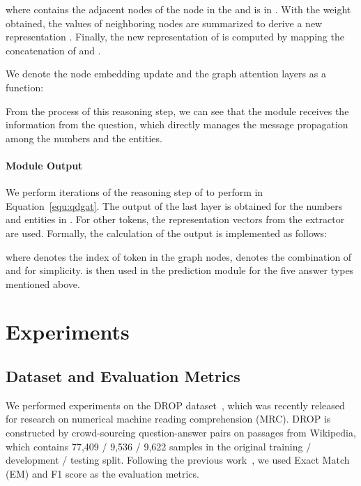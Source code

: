 \documentclass{article}
\begin{document}
where  contains the adjacent nodes of the node  in the  and  is in  .
With the weight  obtained, the values of neighboring nodes are summarized to derive a new representation .
Finally, the new representation of  is computed by mapping the concatenation of  and .


We denote the node embedding update and the graph attention layers as a function:

From the process of this reasoning step, we can see that the module receives the information from the question, which directly manages the message propagation among the numbers and the entities. 

\paragraph{Module Output}
We perform  iterations of the reasoning step of  to perform  in Equation~\ref{equ:qdgat}.
The output of the last layer  is obtained for the numbers and entities in .
For other tokens, the representation vectors from the extractor are used.
Formally, the calculation of the output  is implemented as follows:

where  denotes the index of token  in the graph nodes,  denotes the combination of  and  for simplicity.
 is then used in the prediction module for the five answer types mentioned above. 

\section{Experiments}

\subsection{Dataset and Evaluation Metrics}

We performed experiments on the DROP dataset~\cite{DBLP:conf/naacl/DuaWDSS019}, which was recently released for research on numerical machine reading comprehension (MRC). DROP is constructed by crowd-sourcing question-answer pairs on passages from Wikipedia, which contains 77,409 / 9,536 / 9,622 samples in the original training / development / testing split.
Following the previous work~\cite{DBLP:conf/naacl/DuaWDSS019}, we used Exact Match (EM) and F1 score as the evaluation metrics.
\end{document}
